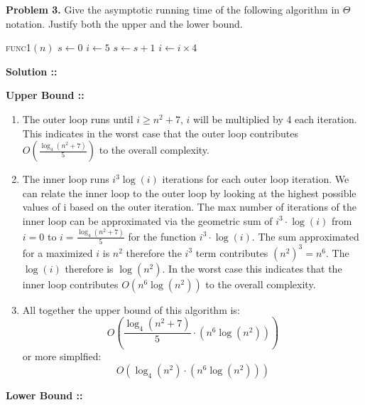 \documentclass[11pt]{article}
\begin{document}

\textbf{Problem 3.} Give the asymptotic running time of the following algorithm 
in $\Theta$ notation. Justify both the upper and the lower bound.

\vspace{10px}
\begin{algorithm}
\textsc{func1$(n)$}\;
$s\gets 0$\;
$i\gets 5$\;
{
    {
        $s\gets s+1$\;
    }
    $i\gets i\times 4$\;
}
\end{algorithm}
\textbf{Solution ::}

\textbf{Upper Bound ::}
\begin{enumerate}[1.]
\item
The outer loop runs until $i \ge n^2 + 7$, $i$ will be multiplied by 4 each iteration.
This indicates in the worst case that the outer loop contributes 
$O\left(\frac{\log_4(n^2 + 7)}{5}\right)$ to 
the overall complexity.

\item
The inner loop runs $i^3\log(i)$ iterations for each outer loop iteration. We can
relate the inner loop to the outer loop by looking at the highest possible values of i
based on the outer iteration. The max number of iterations of the inner loop can be 
approximated via the geometric sum of $i^3\cdot\log(i)$ from $i = 0$ to $i = \frac
{\log_4(n^2 + 7)}{5}$ for the function $i^3\cdot\log(i)$. The sum approximated for
a maximized $i$ is $n^2$ therefore the $i^3$ term contributes $(n^2)^3 = n^6$. The
$\log(i)$ therefore is $\log(n^2)$. In the worst case this indicates that the inner loop
contributes $O(n^6\log(n^2))$ to the overall complexity.

\item 
All together the upper bound of this algorithm is:
$$O\left(\frac{\log_4\left(n^2+7\right)}{5}\cdot
\left(n^6\log\left(n^2\right)\right)\right)$$
or more simplfied:
$$O\left(\log_4\left(n^2\right)\cdot\left(n^6\log\left(n^2\right)\right)\right)$$
\end{enumerate}

\pagebreak
\textbf{Lower Bound ::}
\end{document}
